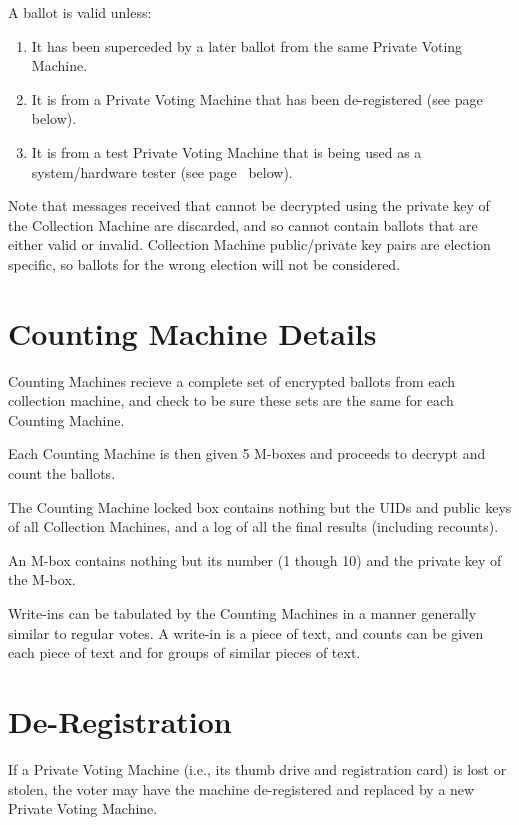 \documentclass[12pt]{article}
\newcommand{\pagref}[1]{(see page~\pageref{#1} below)}
\begin{document}
A ballot is valid unless:

\begin{enumerate}
\item It has been superceded by a later ballot from the same
Private Voting Machine.
\item It is from a Private Voting Machine that has been de-registered
\pagref{DE-REGISTERED}.
\item It is from a test Private Voting Machine that is
being used as a system/hardware tester \pagref{TESTER}.
\end{enumerate}

Note that messages received that cannot be decrypted using the
private key of the Collection Machine
are discarded, and so cannot contain
ballots that are either valid or invalid.  Collection Machine
public/private key pairs are election specific, so ballots for
the wrong election will not be considered.

\section{Counting Machine Details}

Counting Machines recieve a complete set of encrypted ballots
from each collection machine, and check to be sure these sets
are the same for each Counting Machine.

Each Counting Machine is then given 5 M-boxes and proceeds to
decrypt and count the ballots.

The Counting Machine locked box contains nothing but the UIDs
and public keys of all Collection Machines, and a log of all
the final results (including recounts).

An M-box contains nothing but its number (1 though 10)
and the private key of the M-box.

Write-ins can be tabulated by the Counting Machines in a manner
generally similar to regular votes.  A write-in is a piece of
text, and counts can be given each piece of text and for groups
of similar pieces of text.

\section{De-Registration}

If a Private Voting Machine (i.e., its thumb drive and registration
card) is lost or stolen, the voter may have the machine
de-registered\label{DE-REGISTERED}
and replaced by a new Private Voting Machine.
\end{document}
